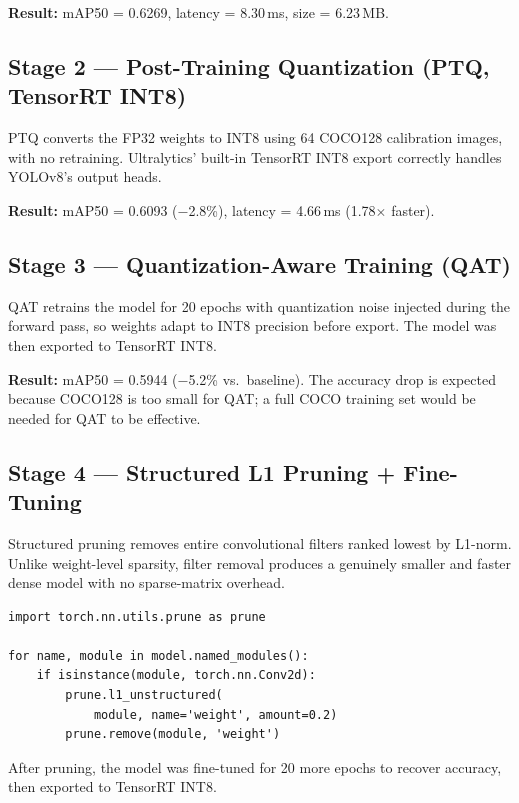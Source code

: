 \documentclass[journal, onecolumn]{IEEEtran}
\begin{document}
\noindent\textbf{Result:} mAP50 = 0.6269, latency = 8.30\,ms, size = 6.23\,MB.

\subsection{Stage 2 — Post-Training Quantization (PTQ, TensorRT INT8)}

PTQ converts the FP32 weights to INT8 using 64 COCO128 calibration images, with no retraining. Ultralytics' built-in TensorRT INT8 export correctly handles YOLOv8's output heads.

\noindent\textbf{Result:} mAP50 = 0.6093 ($-$2.8\%), latency = 4.66\,ms (1.78$\times$ faster).

\subsection{Stage 3 — Quantization-Aware Training (QAT)}

QAT retrains the model for 20 epochs with quantization noise injected during the forward pass, so weights adapt to INT8 precision before export. The model was then exported to TensorRT INT8.

\noindent\textbf{Result:} mAP50 = 0.5944 ($-$5.2\% vs.\ baseline). The accuracy drop is expected because COCO128 is too small for QAT; a full COCO training set would be needed for QAT to be effective.

\subsection{Stage 4 — Structured L1 Pruning + Fine-Tuning}

Structured pruning removes entire convolutional filters ranked lowest by L1-norm. Unlike weight-level sparsity, filter removal produces a genuinely smaller and faster dense model with no sparse-matrix overhead.

\begin{lstlisting}[caption={L1 filter pruning applied to all Conv2d layers},label=lst:prune]
import torch.nn.utils.prune as prune

for name, module in model.named_modules():
    if isinstance(module, torch.nn.Conv2d):
        prune.l1_unstructured(
            module, name='weight', amount=0.2)
        prune.remove(module, 'weight')
\end{lstlisting}

After pruning, the model was fine-tuned for 20 more epochs to recover accuracy, then exported to TensorRT INT8.
\end{document}
